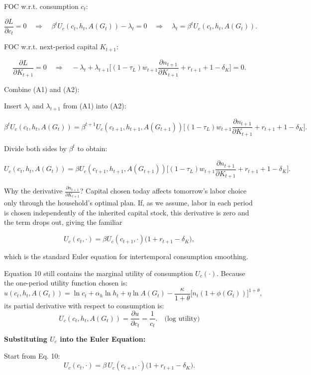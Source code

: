 FOC w.r.t. consumption \( c_t \):

\[
\frac{\partial L}{\partial c_t} = 0 \quad \Longrightarrow \quad \beta^t U_c(c_t, h_t, A(G_t)) - \lambda_t = 0 \quad \Longrightarrow \quad \lambda_t = \beta^t U_c(c_t, h_t, A(G_t)). \tag{A1}
\]

FOC w.r.t. next-period capital \( K_{t+1} \):

\[
\frac{\partial L}{\partial K_{t+1}} = 0 \quad \Longrightarrow \quad -\lambda_t + \lambda_{t+1} \Big[(1-\tau_L)w_{t+1} \frac{\partial n_{t+1}}{\partial K_{t+1}} + r_{t+1} + 1 - \delta_K \Big] = 0. \tag{A2}
\]

Combine (A1) and (A2):

Insert \( \lambda_t \) and \( \lambda_{t+1} \) from (A1) into (A2):

\[
\beta^t U_c(c_t, h_t, A(G_t)) = \beta^{t+1} U_c(c_{t+1}, h_{t+1}, A(G_{t+1})) \Big[(1-\tau_L)w_{t+1} \frac{\partial n_{t+1}}{\partial K_{t+1}} + r_{t+1} + 1 - \delta_K \Big].
\]

Divide both sides by \( \beta^t \) to obtain:

\[
U_c(c_t, h_t, A(G_t)) = \beta U_c(c_{t+1}, h_{t+1}, A(G_{t+1})) \Big[(1-\tau_L)w_{t+1} \frac{\partial n_{t+1}}{\partial K_{t+1}} + r_{t+1} + 1 - \delta_K \Big].
\]

Why the derivative \( \frac{\partial n_{t+1}}{\partial K_{t+1}} \)? Capital chosen today affects tomorrow’s labor choice only through the household’s optimal plan. If, as we assume, labor in each period is chosen independently of the inherited capital stock, this derivative is zero and the term drops out, giving the familiar

\[
U_c(c_t, \cdot) = \beta U_c(c_{t+1}, \cdot) \bigl(1 + r_{t+1} - \delta_K\bigr),
\]

which is the standard Euler equation for intertemporal consumption smoothing.

Equation 10 still contains the marginal utility of consumption \(U_c(\cdot)\). Because the one-period utility function chosen is:
\[
u(c_t, h_t, A(G_t)) = \ln c_t + \alpha_h \ln h_t + \eta \ln A(G_t) - \frac{\kappa}{1+\theta}\bigl[n_t(1+\phi(G_t))\bigr]^{1+\theta}, \tag{6}
\]
its partial derivative with respect to consumption is:
\[
U_c(c_t, h_t, A(G_t)) = \frac{\partial u}{\partial c_t} = \frac{1}{c_t}. \quad\text{(log utility)}
\]

{\bf Substituting \(U_c\) into the Euler Equation:}

Start from Eq. 10:
\[
U_c(c_t,\cdot) = \beta\,U_c(c_{t+1},\cdot)\bigl(1 + r_{t+1} - \delta_K\bigr). \tag{10}
\]

